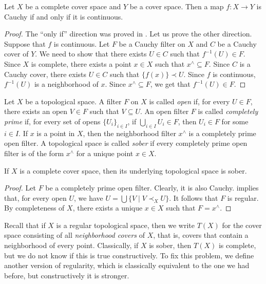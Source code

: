 \documentclass[reqno]{amsart}
\theoremstyle{definition}
\theoremstyle{remark}
\numberwithin{figure}{section}
\newcommand{\rb}{\prec}
\begin{document}
\begin{prop}
Let $X$ be a complete cover space and $Y$ be a cover space.
Then a map $f : X \to Y$ is Cauchy if and only if it is continuous.
\end{prop}
\begin{proof}
The ``only if'' direction was proved in .
Let us prove the other direction.
Suppose that $f$ is continuous.
Let $F$ be a Cauchy filter on $X$ and $C$ be a Cauchy cover of $Y$.
We need to show that there exists $U \in C$ such that $f^{-1}(U) \in F$.
Since $X$ is complete, there exists a point $x \in X$ such that $x^\wedge \subseteq F$.
Since $C$ is a Cauchy cover, there exists $U \in C$ such that $\{ f(x) \} \rb U$.
Since $f$ is continuous, $f^{-1}(U)$ is a neighborhood of $x$.
Since $x^\wedge \subseteq F$, we get that $f^{-1}(U) \in F$.
\end{proof}

Let $X$ be a topological space.
A filter $F$ on $X$ is called \emph{open} if, for every $U \in F$, there exists an open $V \in F$ such that $V \subseteq U$.
An open filter $F$ is called \emph{completely prime} if, for every set of opens $\{ U_i \}_{i \in I}$, if $\bigcup_{i \in I} U_i \in F$, then $U_i \in F$ for some $i \in I$.
If $x$ is a point in $X$, then the neighborhood filter $x^\wedge$ is a completely prime open filter.
A topological space is called \emph{sober} if every completely prime open filter is of the form $x^\wedge$ for a unique point $x \in X$.

\begin{prop}[u-sober]
If $X$ is a complete cover space, then its underlying topological space is sober.
\end{prop}
\begin{proof}
Let $F$ be a completely prime open filter.
Clearly, it is also Cauchy.
 implies that, for every open $U$, we have $U = \bigcup \{ V \mid V \rb_X U \}$.
It follows that $F$ is regular.
By completeness of $X$, there exists a unique $x \in X$ such that $F = x^\wedge$.
\end{proof}

Recall that if $X$ is a regular topological space, then we write $T(X)$ for the cover space consisting of all \emph{neighborhood covers} of $X$, that is, covers that contain a neighborhood of every point.
Classically, if $X$ is sober, then $T(X)$ is complete, but we do not know if this is true constructively.
To fix this problem, we define another version of regularity, which is classically equivalent to the one we had before, but constructively it is stronger.
\end{document}
